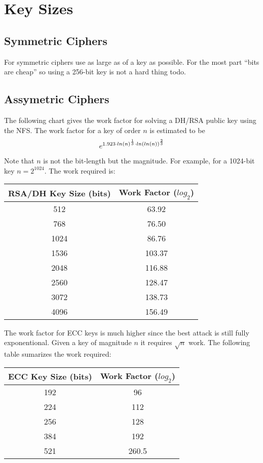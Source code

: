 \documentclass[a4paper]{book}
\begin{document}
\section{Key Sizes}

\subsection{Symmetric Ciphers}
For symmetric ciphers use as large as of a key as possible.  For the most part ``bits are cheap'' so using a 256-bit key
is not a hard thing todo.  

\subsection{Assymetric Ciphers}
The following chart gives the work factor for solving a DH/RSA public key using the NFS.  The work factor for a key of order
$n$ is estimated to be
\begin{equation}
e^{1.923 \cdot ln(n)^{1 \over 3} \cdot ln(ln(n))^{2 \over 3}} 
\end{equation}

Note that $n$ is not the bit-length but the magnitude.  For example, for a 1024-bit key $n = 2^{1024}$.  The work required 
is:
\begin{center}
\begin{tabular}{|c|c|}
    \hline RSA/DH Key Size (bits) & Work Factor ($log_2$) \\
    \hline 512 & 63.92 \\
    \hline 768 & 76.50 \\
    \hline 1024 & 86.76 \\
    \hline 1536 & 103.37 \\
    \hline 2048 & 116.88 \\
    \hline 2560 & 128.47 \\
    \hline 3072 & 138.73 \\
    \hline 4096 & 156.49 \\
    \hline 
\end{tabular}
\end{center}

The work factor for ECC keys is much higher since the best attack is still fully exponentional.  Given a key of magnitude
$n$ it requires $\sqrt n$ work.  The following table sumarizes the work required:
\begin{center}
\begin{tabular}{|c|c|}
    \hline ECC Key Size (bits) & Work Factor ($log_2$) \\
    \hline 192 & 96  \\
    \hline 224 & 112 \\
    \hline 256 & 128 \\
    \hline 384 & 192 \\
    \hline 521 & 260.5 \\
    \hline
\end{tabular}
\end{center}
\end{document}
